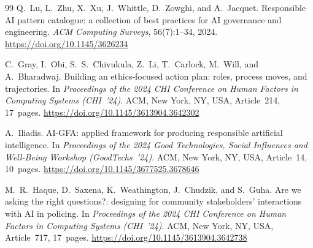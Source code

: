 \documentclass[sigconf,screen]{acmart}
\begin{document}
\begin{thebibliography}{99}
Q.~Lu, L.~Zhu, X.~Xu, J.~Whittle, D.~Zowghi, and A.~Jacquet.
\newblock Responsible AI pattern catalogue: a collection of best practices for AI
governance and engineering.
\newblock \emph{ACM Computing Surveys}, 56(7):1--34, 2024.
\newblock \url{https://doi.org/10.1145/3626234}

C.~Gray, I.~Obi, S.~S.~Chivukula, Z.~Li, T.~Carlock, M.~Will, and A.~Bharadwaj.
\newblock Building an ethics-focused action plan: roles, process moves, and
trajectories.
\newblock In \emph{Proceedings of the 2024 CHI Conference on Human Factors in
Computing Systems (CHI~'24)}. ACM, New York, NY, USA, Article~214, 17~pages.
\newblock \url{https://doi.org/10.1145/3613904.3642302}

A.~Iliadis.
\newblock AI-GFA: applied framework for producing responsible artificial
intelligence.
\newblock In \emph{Proceedings of the 2024 Good Technologies, Social Influences and
Well-Being Workshop (GoodTechs~'24)}. ACM, New York, NY, USA, Article~14,
10~pages.
\newblock \url{https://doi.org/10.1145/3677525.3678646}

M.~R.~Haque, D.~Saxena, K.~Weathington, J.~Chudzik, and S.~Guha.
\newblock Are we asking the right questions?: designing for community stakeholders'
interactions with AI in policing.
\newblock In \emph{Proceedings of the 2024 CHI Conference on Human Factors in
Computing Systems (CHI~'24)}. ACM, New York, NY, USA, Article~717, 17~pages.
\newblock \url{https://doi.org/10.1145/3613904.3642738}
\end{thebibliography}
\end{document}
